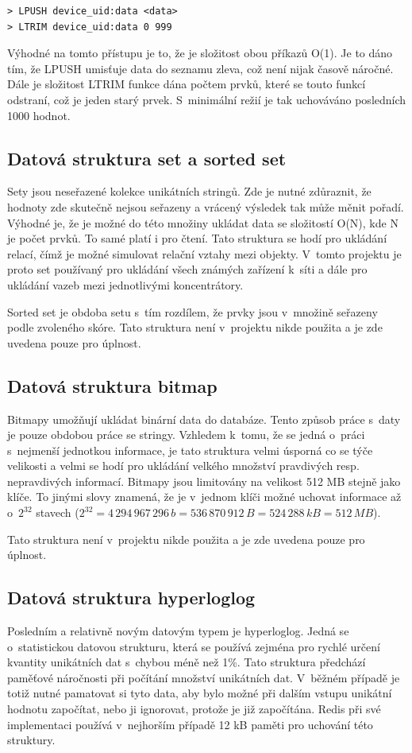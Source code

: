 \begin{verbatim}
> LPUSH device_uid:data <data>
> LTRIM device_uid:data 0 999
\end{verbatim}

Výhodné na tomto přístupu je to, že je složitost obou příkazů O(1). Je to dáno tím, že LPUSH umisťuje data do seznamu zleva, což není nijak časově náročné. Dále je složitost LTRIM funkce dána počtem prvků, které se touto funkcí odstraní, což je jeden starý prvek. S~minimální režií je tak uchováváno posledních 1000 hodnot.

\subsection{Datová struktura set a sorted set}
Sety jsou neseřazené kolekce unikátních stringů. Zde je nutné zdůraznit, že hodnoty zde skutečně nejsou seřazeny a vrácený výsledek tak může měnit pořadí. Výhodné je, že je možné do této množiny ukládat data se složitostí O(N), kde N je počet prvků. To samé platí i pro čtení. Tato struktura se hodí pro ukládání relací, čímž je možné simulovat relační vztahy mezi objekty. V~tomto projektu je proto set používaný pro ukládání všech známých zařízení k~síti a dále pro ukládání vazeb mezi jednotlivými koncentrátory.

Sorted set je obdoba setu s~tím rozdílem, že prvky jsou v~množině seřazeny podle zvoleného skóre. Tato struktura není v~projektu nikde použita a je zde uvedena pouze pro úplnost.

\subsection{Datová struktura bitmap}
Bitmapy umožňují ukládat binární data do databáze. Tento způsob práce s~daty je pouze obdobou práce se stringy. Vzhledem k~tomu, že se jedná o~práci s~nejmenší jednotkou informace, je tato struktura velmi úsporná co se týče velikosti a velmi se hodí pro ukládání velkého množství pravdivých resp. nepravdivých informací. Bitmapy jsou limitovány na velikost 512 MB stejně jako klíče. To jinými slovy znamená, že je v~jednom klíči možné uchovat informace až o~$2^{32}$ stavech ($2^{32} = 4\,294\,967\,296\,b = 536\,870\,912\,B = 524\,288\,kB = 512\,MB$).

Tato struktura není v~projektu nikde použita a je zde uvedena pouze pro úplnost.

\subsection{Datová struktura hyperloglog}
Posledním a relativně novým datovým typem je hyperloglog. Jedná se o~statistickou datovou strukturu, která se používá zejména pro rychlé určení kvantity unikátních dat s~chybou méně než 1\%. Tato struktura předchází paměťové náročnosti při počítání množství unikátních dat. V~běžném případě je totiž nutné pamatovat si tyto data, aby bylo možné při dalším vstupu unikátní hodnotu započítat, nebo ji ignorovat, protože je již započítána. Redis při své implementaci používá v~nejhorším případě 12 kB paměti pro uchování této struktury.

